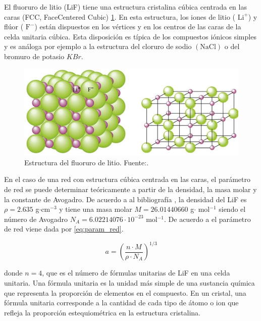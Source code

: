 El fluoruro de litio (LiF) tiene una estructura cristalina cúbica centrada en las caras (FCC, FaceCentered Cubic) \ref{fig:str_lif}. En esta estructura, los iones de litio ( $\mathrm{Li}^{+}$) y flúor ( $\mathrm{F}^{-}$) están dispuestos en los vértices y en los centros de las caras de la celda unitaria cúbica. Esta disposición es típica de los compuestos iónicos simples y es análoga por ejemplo a la estructura del cloruro de sodio $(\mathrm{NaCl})$ o del bromuro de potasio $KBr$.


\begin{figure}[H]
	\centering
	\begin{minipage}{0.5\textwidth} 
		\includegraphics[width=\textwidth]{grafico_2x06_lif_structure.png}
		\caption{\footnotesize Estructura del  fluoruro de litio. Fuente:\cite{strlif}.}
		\label{fig:str_lif}
	\end{minipage}
\end{figure}




\vspace{\baselineskip}

En el caso de una red con estructura cúbica centrada en las caras, el parámetro de red se puede determinar teóricamente a partir de la densidad, la masa molar y la constante de Avogadro. De acuerdo a al bibliografía \cite{LiF_quim}, la densidad del LiF es $\rho = 2.635$ g$\cdot$cm$^{-3}$ y tiene una masa molar  $M=26.01440660$ g$\cdot$ mol$^{-1}$ siendo el número de Avogadro $N_A= 6.02214076\cdot 10^{-23}$ mol$^{-1}$. De acuerdo a \cite{Wahab2021} el parámetro de red viene dada por \ref{eq:param_red}. 

\begin{equation}\label{eq:param_red}
	a=\left(\frac{n \cdot M}{\rho \cdot N_A}\right)^{1 / 3}
\end{equation}



donde $n=4$, que es el número de fórmulas unitarias de LiF en una celda unitaria. Una fórmula unitaria es la unidad más simple de una sustancia química que representa la proporción de elementos en el compuesto. En un cristal, una fórmula unitaria corresponde a la cantidad de cada tipo de átomo o ion que refleja la proporción estequiométrica en la estructura cristalina.

